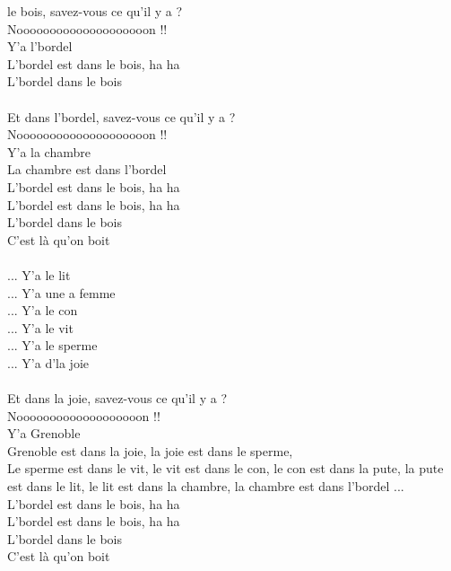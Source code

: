 
 le bois, savez-vous ce qu'il y a ?
\\Noooooooooooooooooooon !!
\\Y'a l'bordel
\\L'bordel est dans le bois, ha ha
\\L'bordel dans le bois
\\\\Et dans l'bordel, savez-vous ce qu'il y a ?
\\Noooooooooooooooooooon !!
\\Y'a la chambre
\\La chambre est dans l'bordel
\\L'bordel est dans le bois, ha ha
\\L'bordel est dans le bois, ha ha
\\L'bordel dans le bois
\\C'est là qu'on boit
\\\\... Y'a le lit
\\... Y'a une a femme
\\... Y'a le con
\\... Y'a le vit
\\... Y'a le sperme
\\... Y'a d'la joie
\\\\Et dans la joie, savez-vous ce qu'il y a ?
\\Nooooooooooooooooooon !!
\\Y'a Grenoble
\\Grenoble est dans la joie, la joie est dans le sperme,
\\Le sperme est dans le vit, le vit est dans le con, le con est dans la pute, la pute est dans le lit, le lit est dans la chambre, la chambre est dans l'bordel ...
\\L'bordel est dans le bois, ha ha
\\L'bordel est dans le bois, ha ha
\\L'bordel dans le bois
\\C'est là qu'on boit

\breakpage